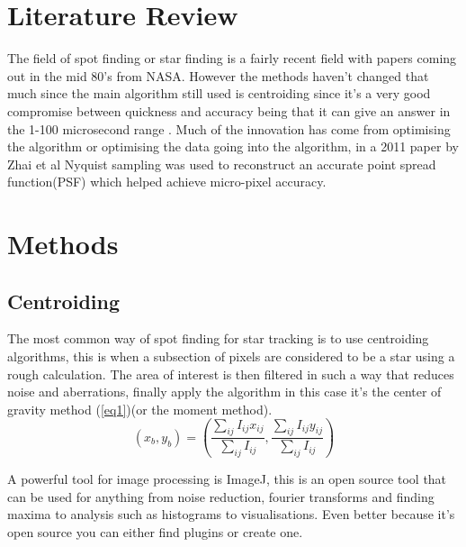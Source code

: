 \documentclass[aps,pra,a4paper,nofootinbib,onecolumn,tightenlines,longbibliography,12pt,amsfonts,amssymb,amsmath,floatfix]{revtex4-2} %
\begin{document}
  



\section{Literature Review} %
\label{sec:lit review}


The field of spot finding or star finding is a fairly recent field with papers
coming out in the mid 80's from NASA. However the methods haven't changed that
much since the main algorithm still used is centroiding since it's a very good
compromise between quickness and accuracy being that it can give an answer in
the 1-100 microsecond range \cite{delabie2014accurate}. Much of the innovation
has come from optimising the algorithm or optimising the data going into the
algorithm, in a 2011 paper by Zhai et al\cite{zhai2011micro} Nyquist sampling
was used to reconstruct an accurate point spread function(PSF) which helped
achieve micro-pixel accuracy.


\section{Methods} %
\label{sec:Background}

  \subsection{Centroiding} %
  \label{sub:Centroiding_meth}
  
  
  
  The most common way of spot finding for star tracking is to use centroiding
  algorithms, this is when a subsection of pixels are considered to be a star
  using a rough calculation. The area of interest is then filtered in such a way
  that reduces noise and aberrations, finally apply the algorithm in this case
  it's the center of gravity method (\ref{eq1})(or the moment
  method)\cite{delabie2014accurate}\cite{stone1989comparison}.
  \begin{equation}\label{eq1}
      (x_b,y_b) = \left( {\frac{\sum_{ij} I_{ij}x_{ij}}{\sum_{ij} I_{ij}},\frac{\sum_{ij} I_{ij}y_{ij}}{\sum_{ij} I_{ij}}}\right)
  \end{equation}
  
  A powerful tool for image processing is ImageJ, this is an open source tool
  that can be used for anything from noise reduction, fourier transforms and
  finding maxima to analysis such as histograms to visualisations. 
  Even better because it's open source you can either find plugins or create one.
  \cite{van2019single}
  
\end{document}
